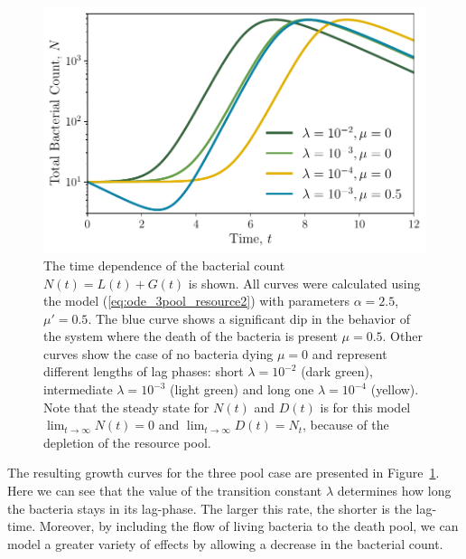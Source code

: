 \documentclass[10pt,twocolumn,5p]{elsarticle}
\numberwithin{equation}{section}
\begin{document}
\begin{figure}
    \begin{center}
    \includegraphics[width=0.9\columnwidth]{Figures-pool_model_3pools_resource.pdf}
    \caption{
        The time dependence of the bacterial count $N(t) = L(t) + G(t) $ is shown.
        All curves were calculated using the model (\ref{eq:ode_3pool_resource2}) with parameters $\alpha=2.5$, $\mu'=0.5$.
        The blue curve shows a significant dip in the behavior of the system where the death of the bacteria is present $\mu = 0.5$.
        Other curves show the case of no bacteria dying $\mu=0$ and represent different lengths of lag phases: short $\lambda=10^{-2}$ (dark green), intermediate $\lambda=10^{-3}$ (light green) and long one $\lambda=10^{-4}$ (yellow). Note that the steady state for $N(t)$ and $D(t)$ is for this model $\lim_{t\to\infty} N(t)=0$ and $\lim_{t\to\infty} D(t)=N_t$, because of the depletion of the resource pool. 
    }
    \label{fig:3pool_resource_plots}
    \end{center}
\end{figure}
The resulting growth curves for the three pool case are presented in Figure~\ref{fig:3pool_resource_plots}.
Here we can see that the value of the transition constant $\lambda$ determines how long the bacteria stays in its lag-phase.
The larger this rate, the shorter is the lag-time.
Moreover, by including the flow of living bacteria to the death pool, we can model a greater variety of effects by allowing a decrease in the bacterial count.
%
%
\end{document}
